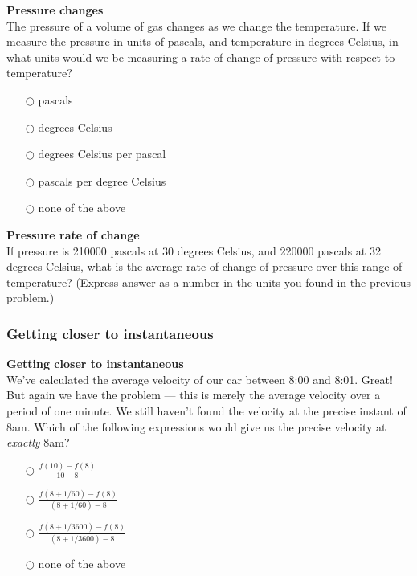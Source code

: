 \documentclass[pdftex, brazil, 12pt, twoside]{article}
\begin{document}
\begin{exercise}
  \textbf{Pressure changes}\\%
  The pressure of a volume of gas changes as we change
  the temperature. If we measure the pressure in units of pascals, and temperature
  in degrees Celsius, in what units would we be measuring a rate of change of
  pressure with respect to temperature?
\begin{itemize}[noitemsep]
\item[$\bigcirc$] pascals
\item[$\bigcirc$] degrees Celsius
\item[$\bigcirc$] degrees Celsius per pascal
\item[$\bigcirc$] pascals per degree Celsius
\item[$\bigcirc$] none of the above
\end{itemize}
\end{exercise}

\begin{exercise}
  \textbf{Pressure rate of change}\\%
  If pressure is 210000 pascals at 30 degrees
  Celsius, and 220000 pascals at 32 degrees Celsius, what is the average rate
  of change of pressure over this range of temperature? (Express answer as a number
  in the units you found in the previous problem.)
\end{exercise}

\subsubsection{Getting closer to instantaneous}
\label{u1-what-getting-closer}

\begin{exercise}
  \textbf{Getting closer to instantaneous}\\%
  We've calculated the average velocity
  of our car between 8:00 and 8:01. Great! But again we have the problem --- this
  is merely the average velocity over a period of one minute. We still haven't
  found the velocity at the precise instant of 8am. Which of the following expressions
  would give us the precise velocity at \emph{exactly} 8am? 
\begin{itemize}
\item[$\bigcirc$] $\displaystyle \frac{f(10)-f(8)}{10-8}$
\item[$\bigcirc$] $\displaystyle \frac{f(8+1/60)-f(8)}{(8+1/60)-8}$
\item[$\bigcirc$] $\displaystyle \frac{f(8+1/3600)-f(8)}{(8+1/3600)-8}$
\item[$\bigcirc$] none of the above
\end{itemize}
\end{exercise}
\end{document}
